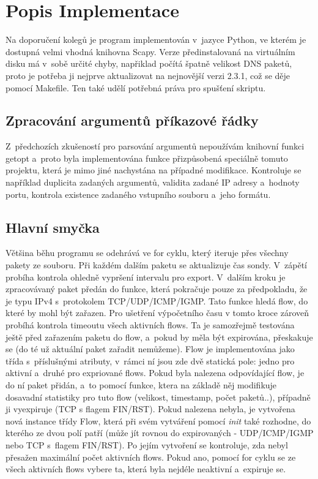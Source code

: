 \documentclass[12pt,a4paper,titlepage]{extarticle}
\begin{document}
\pagebreak

\section{Popis Implementace}
Na doporučení kolegů je program implementován v~jazyce Python, ve kterém je dostupná velmi vhodná knihovna Scapy. Verze předinstalovaná na virtuálním disku má v~sobě určité chyby, napřiklad počítá špatně velikost DNS paketů, proto je potřeba ji nejprve aktualizovat na nejnovější verzi 2.3.1, což se děje pomocí Makefile. Ten také udělí potřebná práva pro spušťení skriptu.

\subsection{Zpracování argumentů příkazové řádky}
Z~předchozích zkušeností pro parsování argumentů nepoužívám knihovní funkci getopt a~proto byla implementována funkce přizpůsobená speciálně tomuto projektu, která je mimo jiné nachystána na případné modifikace. Kontroluje se například duplicita zadaných argumentů, validita zadané IP adresy a~hodnoty portu, kontrola existence zadaného vstupního souboru a~jeho formátu.

\subsection{Hlavní smyčka}
Většina běhu programu se odehrává ve for cyklu, který iteruje přes všechny pakety ze souboru. Při každém dalším paketu se aktualizuje čas sondy. V~zápětí probíha kontrola ohledně vypršení intervalu pro export. V~dalším kroku je zpracovávaný paket předán do funkce, která pokračuje pouze za předpokladu, že je typu IPv4 s~protokolem TCP/UDP/ICMP/IGMP. Tato funkce hledá flow, do které by mohl být zařazen. Pro ušetření výpočetního času v tomto kroce zároveň probíhá kontrola timeoutu všech aktivních flows. Ta je samozřejmě testována ještě před zařazením paketu do flow, a~pokud by měla být expirována, přeskakuje se (do té už aktuální paket zařadit nemůžeme). Flow je implementována jako třída s~příslušnými atributy, v~rámci ní jsou zde dvě statická pole: jedno pro aktivní a~druhé pro expriované flows. Pokud byla nalezena odpovídající flow, je do ní paket přidán, a~to pomocí funkce, ktera na základě něj modifikuje dosavadní statistiky pro tuto flow (velikost, timestamp, počet paketů..), případně ji vyexpiruje (TCP s flagem FIN/RST). Pokud nalezena nebyla, je vytvořena nová instance třídy Flow, která při svém vytváření pomocí \emph{init} také rozhodne, do kterého ze dvou polí patří (může jít rovnou do expirovaných - UDP/ICMP/IGMP nebo TCP s~flagem FIN/RST). Po jejím vytvoření se kontroluje, zda nebyl přesažen maximální počet aktivních flows. Pokud ano, pomocí for cyklu se ze všech aktivních flows vybere ta, která byla nejdéle neaktivní a~expiruje se.
\end{document}
